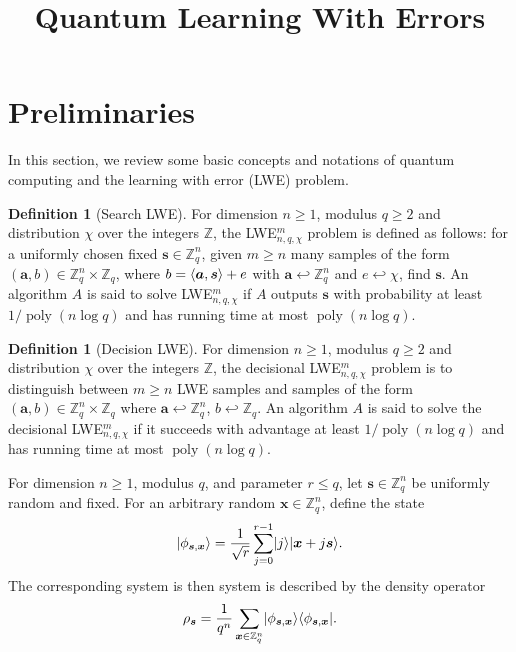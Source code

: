 \documentclass[11pt]{article}
\title{Quantum Learning With Errors}
\author{
}
\date{}
\theoremstyle{plain}
\theoremstyle{definition}
\newtheorem{definition}[theorem]{Definition}
\DeclareMathOperator{\poly}{poly}
\DeclarePairedDelimiter{\ldbrac}{\lvert}{\rangle}
\DeclarePairedDelimiter{\rdbrac}{\langle}{\rvert}
\DeclarePairedDelimiter{\lrang}{\langle}{\rangle}
\def\Z{\ensuremath{\mathbb{Z}}}
\begin{document}
\maketitle








\section{Preliminaries}


In this section, we review some basic concepts and notations of quantum computing and the learning with error (LWE) problem. 

\begin{definition}[Search LWE]
    For dimension $n \ge 1$, modulus $q \ge 2$ and distribution $\chi$ over the integers $\Z$, the LWE$_{n, q, \chi}^m$ problem is defined as follows: for a uniformly chosen fixed $\bm{s} \in \Z_q^n$, given $m \ge n$ many samples of the form $(\bm{a}, b) \in \Z_q^n \times \Z_q$, where $b = \lrang{\bm{a}, \bm{s}} + e$ with $\bm{a} \hookleftarrow \Z_q^n$ and $e \hookleftarrow \chi$, find $\bm{s}$. An algorithm $A$ is said to solve LWE$_{n, q, \chi}^m$ if $A$  outputs $\bm{s}$ with probability at least $1 / \poly(n\log q)$ and has running time at most $\poly(n \log q)$.
\end{definition}
\begin{definition}[Decision LWE]
    For dimension $n \ge 1$, modulus $q \ge 2$ and distribution $\chi$ over the integers $\Z$, the decisional LWE$_{n, q, \chi}^m$ problem is to distinguish between $m \ge n$ LWE samples and samples of the form $(\bm{a}, b) \in \Z_q^n \times \Z_q$ where $\bm{a} \hookleftarrow \Z_q^n$, $b \hookleftarrow \Z_q$. An algorithm $A$ is said to solve the decisional LWE$_{n, q, \chi}^m$ if it succeeds with advantage at least $1 / \poly(n\log q)$ and has running time at most $\poly(n\log q)$. 
\end{definition}
For dimension $n \ge 1$, modulus $q$, and parameter $r \le q$, let $\bm{s} \in \Z_q^n$ be uniformly random and fixed. For an arbitrary random $\bm{x} \in \Z_q^n$, define the state
\[ \ldbrac{\phi_{\bm{s}, \bm{x}}} = \frac{1}{\sqrt{r}} \sum_{j = 0}^{r - 1}\ldbrac{j}\ldbrac{\bm{x} + j\bm{s}}. \]
The corresponding system is then system is described by the density operator  
\[ \rho_{\bm{s}} = \frac{1}{q^n} \sum_{\bm{x} \in \Z_q^n} \ldbrac{\phi_{\bm{s}, \bm{x}}} \rdbrac{\phi_{\bm{s}, \bm{x}}}. \]
\end{document}
